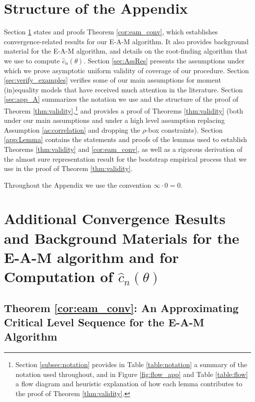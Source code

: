 \documentclass[letterpaper,11pt]{article}
\theoremstyle{myplain}
\theoremstyle{mydefinition}
\theoremstyle{myremark}
\numberwithin{equation}{section}
\numberwithin{figure}{section}
\begin{document}
\begin{appendices}
\section*{Structure of the Appendix}
Section \ref{sec:background} states and proofs Theorem \ref{cor:eam_conv}, which establishes convergence-related results for our E-A-M algorithm. It also provides background material for the E-A-M algorithm, and details on the root-finding algorithm that we use to compute $\hat{c}_n(\theta)$. 
Section \ref{sec:AssRes} presents the assumptions under which we prove asymptotic uniform validity of coverage of our procedure.
Section \ref{sec:verify_examples} verifies some of our main assumptions for moment (in)equality models that have received much attention in the literature.
Section \ref{sec:app_A} summarizes the notation we use and the structure of the proof of Theorem \ref{thm:validity},\footnote{Section \ref{subsec:notation} provides in Table \ref{table:notation} a summary of the notation used throughout, and in Figure \ref{fig:flow_app} and Table \ref{table:flow} a flow diagram and heuristic explanation of how each lemma contributes to the proof of Theorem \ref{thm:validity}.} 
and provides a proof of Theorems \ref{thm:validity} (both under our main assumptions and under a high level assumption replacing Assumption \ref{as:correlation} and dropping the $\rho$-box constraints). 
Section \ref{app:Lemma} contains the statements and proofs of the lemmas used to establish Theorems \ref{thm:validity} and \ref{cor:eam_conv}, as well as a rigorous derivation of the almost sure representation result for the bootstrap empirical process that we use in the proof of Theorem \ref{thm:validity}. 

Throughout the Appendix we use the convention $\infty \cdot 0 = 0$. 

\setcounter{section}{3}


\section{Additional Convergence Results and Background Materials for the E-A-M algorithm and for Computation of $\hat{c}_n(\theta)$ }
\label{sec:background}
\subsection{Theorem \ref{cor:eam_conv}: An Approximating Critical Level Sequence for the E-A-M Algorithm}

\end{appendices}
\end{document}
